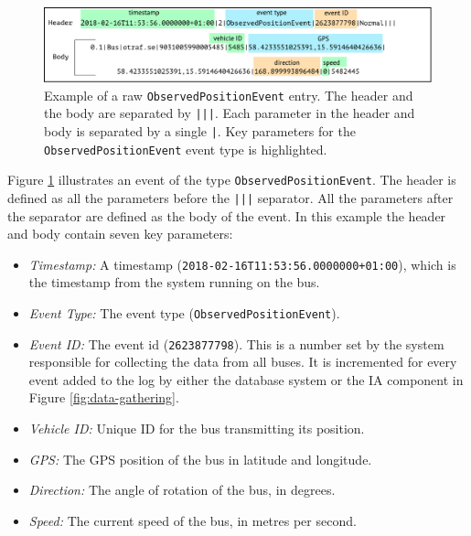 \begin{figure}[t!]
    \centering
    \includegraphics[width=\textwidth]{figures/data-example-1}
    \caption[Example of a raw \texttt{ObservedPositionEvent} entry]
    {\small Example of a raw \texttt{ObservedPositionEvent} entry.
    The header and the body are separated by \texttt{|||}.
    Each parameter in the header and body is separated by a single \texttt{|}.
    Key parameters for the \texttt{ObservedPositionEvent} event type is highlighted.}
    \label{fig:data-ex-1}
\end{figure}

Figure \ref{fig:data-ex-1} illustrates an event of the type \texttt{ObservedPositionEvent}.
The header is defined as all the parameters before the \texttt{|||} separator.
All the parameters after the separator are defined as the body of the event.
In this example the header and body contain seven key parameters: 
\begin{itemize}
    \item \textit{Timestamp:} A timestamp (\texttt{2018-02-16T11:53:56.0000000+01:00}), which is the timestamp from the system running on the bus.
    \item \textit{Event Type:} The event type (\texttt{ObservedPositionEvent}).
    \item \textit{Event ID:} The event id (\texttt{2623877798}). This is a number set by the system responsible for collecting the data from all buses.
    It is incremented for every event added to the log by either the database system or the IA component in Figure \ref{fig:data-gathering}.
    \item \textit{Vehicle ID:} Unique ID for the bus transmitting its position.
    \item \textit{GPS:} The GPS position of the bus in latitude and longitude.
    \item \textit{Direction:} The angle of rotation of the bus, in degrees.
    \item \textit{Speed:} The current speed of the bus, in metres per second.
\end{itemize}

